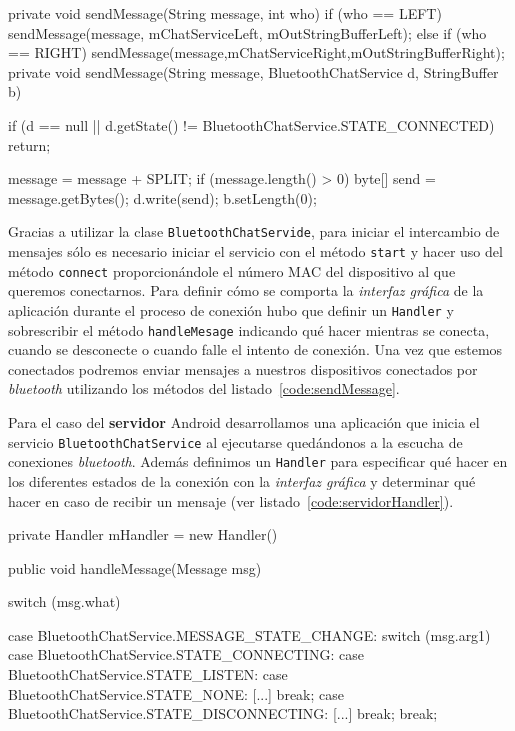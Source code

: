 \begin{definitionlist}
\begin{listing}[
  language = java,
  caption  = {Métodos utilizados para enviar mensajes por bluetooth haciendo uso de la clase
               \texttt{BluetoothChatServide}},
  label    = code:sendMessage]
[...]

private void sendMessage(String message, int who) {
  if (who == LEFT) {
    sendMessage(message, mChatServiceLeft, mOutStringBufferLeft);
  } else if (who == RIGHT) {
    sendMessage(message,mChatServiceRight,mOutStringBufferRight);
  }
}
private void sendMessage(String message, BluetoothChatService d, StringBuffer b) {
  if (d == null || 
      d.getState() != BluetoothChatService.STATE_CONNECTED) {
    return;
  }
    	
  message = message + SPLIT;
  if (message.length() > 0) {
      byte[] send = message.getBytes();
      d.write(send);
      b.setLength(0);
  }
}
\end{listing}

    Gracias a utilizar la clase \texttt{BluetoothChatServide}, para iniciar el intercambio de
    mensajes sólo es necesario iniciar el servicio con el método \texttt{start} y hacer uso del
    método \texttt{connect} proporcionándole el número \acf{MAC} del dispositivo al que queremos
    conectarnos. Para definir cómo se comporta la \emph{interfaz gráfica } de la aplicación durante
    el proceso de conexión hubo que definir un \texttt{Handler} y sobrescribir el método
    \texttt{handleMesage} indicando qué hacer mientras se conecta, cuando se desconecte o cuando
    falle el intento de conexión. Una vez que estemos conectados podremos enviar mensajes a nuestros
    dispositivos conectados por \emph{bluetooth} utilizando los métodos del
    listado~\ref{code:sendMessage}.

    Para el caso del \textbf{servidor} Android desarrollamos una aplicación que inicia el servicio
    \texttt{BluetoothChatService} al ejecutarse quedándonos a la escucha de conexiones
    \emph{bluetooth}. Además definimos un \texttt{Handler} para especificar qué hacer en los
    diferentes estados de la conexión con la \emph{interfaz gráfica} y determinar qué hacer en caso
    de recibir un mensaje (ver listado~\ref{code:servidorHandler}).

\begin{listing}[
  float=ht,
  language = java,
  caption  = {Métodos utilizados en los servidores para leer los mensajes recibidos por medio de
               la clase \texttt{BluetoothChatServide} },
  label    = code:servidorHandler]
private Handler mHandler = new Handler() {
  public void handleMessage(Message msg) {
    switch (msg.what) {
      case BluetoothChatService.MESSAGE_STATE_CHANGE:
        switch (msg.arg1) {
          case BluetoothChatService.STATE_CONNECTING:
          case BluetoothChatService.STATE_LISTEN:
          case BluetoothChatService.STATE_NONE:
            [...]
            break;
          case  BluetoothChatService.STATE_DISCONNECTING:
            [...]
            break;
        }
        break;

}}}
\end{listing}
\end{definitionlist}
